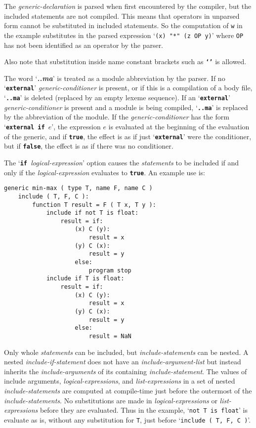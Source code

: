 \documentclass[12pt]{article}
\makeatletter
\newcommand{\TT}[1]{{\tt \bfseries #1}}
\newcommand{\key}[1]{{\bf \em #1}\index{#1}}
\newcommand{\ttkey}[1]{\TT{#1}\index{#1@{\tt #1}}}
\newenvironment{indpar}[1][0.3in]%
	{\begin{list}{}%
		     {\setlength{\itemsep}{0in}%
		      \setlength{\topsep}{0in}%
		      \setlength{\parsep}{1ex}%
		      \setlength{\labelwidth}{#1}%
		      \setlength{\leftmargin}{#1}%
		      \addtolength{\leftmargin}{\labelsep}}%
	 \item}%
	{\end{list}}
\makeatother
\begin{document}
The {\em generic-declaration} is parsed when first encountered
by the compiler, but the included statements are not
compiled.
This means that operators in unparsed form cannot be substituted
in included statements.  So the computation of {\tt w} in the
example substitutes in the parsed expression `{\tt (x) "*" (z OP y)}'
where {\tt OP} has not been identified as an operator by the parser.

Also note that substitution inside name constant brackets such as
\TT{`'} is allowed.

The word `\key{..ma}' is treated as a module abbreviation by the
parser.\label{EXTERNAL-CONDITIONER-EXPLANATION}
If no `\ttkey{external}' {\em generic-conditioner} is present, or
if this is a compilation of a body file, `\TT{..ma}'
is deleted (replaced by an empty lexeme sequence).
If an `\TT{external}' {\em generic-conditioner} is present and a module
is being compiled, `\TT{..ma}'
is replaced by the abbreviation of the module.
If the {\em generic-conditioner} has the form `\TT{external if $e$}',
the expression $e$ is evaluated at the beginning of the evaluation of
the generic, and if \TT{true}, the effect is as if just `\TT{external}'
were the conditioner, but if \TT{false}, the effect is as if there
was no conditioner.

The `\TT{if }{\em logical-expression}' option
causes the {\em statements} to be included if and only if the
{\em logical-expression} evaluates to \TT{true}.  An example use is:
\begin{indpar}\begin{verbatim}
generic min-max ( type T, name F, name C )
    include ( T, F, C ):
        function T result = F ( T x, T y ):
            include if not T is float:
                result = if:
                    (x) C (y):
                        result = x
                    (y) C (x):
                        result = y
                    else:
                        program stop
            include if T is float:
                result = if:
                    (x) C (y):
                        result = x
                    (y) C (x):
                        result = y
                    else:
                        result = NaN
\end{verbatim}\end{indpar}

Only whole {\em statements} can be included, but {\em include-statements}
can be nested.  A nested {\em include-if-statement} does not have an
{\em include-argument-list} but instead inherits the {\em include-arguments}
of its containing {\em include-statement}.  The values of include arguments,
{\em logical-expressions}, and {\em list-expressions} in a set of
nested {\em include-statements} are computed at compile-time
just before the outermost of the {\em include-statements}.
No substitutions are made in {\em logical-expressions} or {\em list-expressions}
before they are evaluated.  Thus in the example, `{\tt not T is float}'
is evaluate as is, without any substitution for {\tt T},
just before `{\tt include ( T, F, C )}'.
\end{document}
